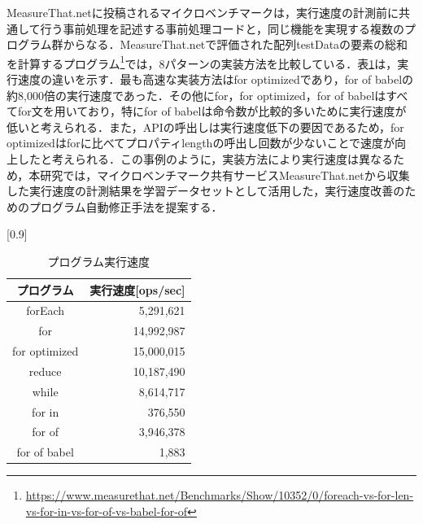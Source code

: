 \documentclass[submit,ses,noauthor]{ipsj}
\begin{document}

MeasureThat.netに投稿されるマイクロベンチマークは，実行速度の計測前に共通して行う事前処理を記述する事前処理コードと，同じ機能を実現する複数のプログラム群からなる．MeasureThat.netで評価された配列testDataの要素の総和を計算するプログラム\footnote{\url{https://www.measurethat.net/Benchmarks/Show/10352/0/foreach-vs-for-len-vs-for-in-vs-for-of-vs-babel-for-of}}では，8パターンの実装方法を比較している．表\ref{table:speed}は，実行速度の違いを示す．最も高速な実装方法はfor optimizedであり，for of babelの約8,000倍の実行速度であった．その他にfor，for optimized，for of babelはすべてfor文を用いており，特にfor of babelは命令数が比較的多いために実行速度が低いと考えられる．また，APIの呼出しは実行速度低下の要因である\cite{selakovic_2016}ため，for optimizedはforに比べてプロパティlengthの呼出し回数が少ないことで速度が向上したと考えられる．この事例のように，実装方法により実行速度は異なるため，本研究では，マイクロベンチマーク共有サービスMeasureThat.netから収集した実行速度の計測結果を学習データセットとして活用した，実行速度改善のためのプログラム自動修正手法を提案する．


\begin{table}[t]
  \caption{プログラム実行速度}
  \label{table:speed}
  \centering
    \scalebox{0.9}[0.9]{
  \begin{tabular}{c|r}
    \hline
    プログラム & 実行速度[ops/sec]\\
    \hline
    forEach & 5,291,621 \\
    for & 14,992,987 \\
    for optimized & 15,000,015 \\
    reduce & 10,187,490 \\
    while & 8,614,717 \\
    for in & 376,550 \\
    for of & 3,946,378 \\
    for of babel & 1,883 \\
    \hline
  \end{tabular}
  }
  \vspace{-4mm}
\end{table}
\end{document}
